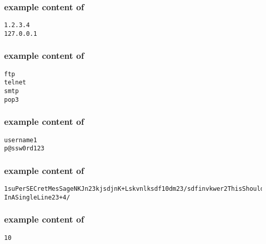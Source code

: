 \hypertarget{wifiipformat}{}
\subsubsection*{example content of \texttt{\hyperlink{cp2wifiip}{\filewifiip}}}
\begin{mdframed}
\begin{Verbatim}
1.2.3.4
127.0.0.1
\end{Verbatim}
\end{mdframed}

\hypertarget{protocolformat}{}
\subsubsection*{example content of \texttt{\hyperlink{cp2protocol}{\fileprotocol}}}
\begin{mdframed}
\begin{Verbatim}
ftp
telnet
smtp
pop3
\end{Verbatim}
\end{mdframed}

\hypertarget{credformat}{}
\subsubsection*{example content of \texttt{\hyperlink{cp2cred}{\filecred}}}
\begin{mdframed}
\begin{Verbatim}
username1
p@ssw0rd123
\end{Verbatim}
\end{mdframed}

\pagebreak

\hypertarget{secretformat}{}
\subsubsection*{example content of \texttt{\hyperlink{cp2secret}{\filesecret}}}
\begin{mdframed}
\begin{Verbatim}
1suPerSECretMesSageNKJn23kjsdjnK+Lskvnlksdf10dm23/sdfinvkwer2ThisShouldBe
InASingleLine23+4/
\end{Verbatim}
\end{mdframed}

\hypertarget{jailtimeformat}{}
\subsubsection*{example content of \texttt{\hyperlink{cp2jailtime}{\filejailtime}}}
\begin{mdframed}
\begin{Verbatim}
10
\end{Verbatim}
\end{mdframed}

